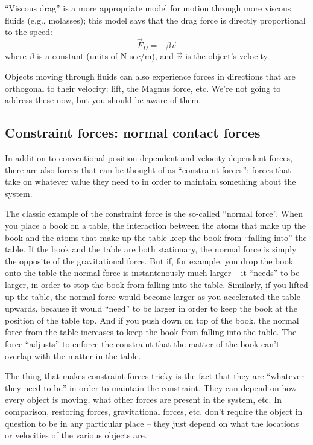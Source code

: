 \documentclass{tufte-handout}
\begin{document}
``Viscous drag'' is a more appropriate model for motion through more viscous fluids (e.g., molasses); this model says that the drag force is directly proportional to the speed:
$$\vec{F}_{D} = -\beta \vec{v}$$
where $\beta$ is a constant (units of N-sec/m), and $\vec{v}$ is the object's velocity.

Objects moving through fluids can also experience forces in directions that are orthogonal to their velocity: lift, the Magnus force, etc.  We're not going to address these now, but you should be aware of them.

\subsection{Constraint forces: normal contact forces}

In addition to conventional position-dependent and velocity-dependent forces, there are also forces that can be thought of as ``constraint forces'': forces that take on whatever value they need to in order to maintain something about the system.  

The classic example of the constraint force is the so-called ``normal force''.  When you place a book on a table, the interaction between the atoms that make up the book and the atoms that make up the table keep the book from ``falling into'' the table.  
If the book and the table are both stationary, the normal force is simply the opposite of the gravitational force.  But if, for example, you drop the book onto the table the normal force is instantenously much larger -- it ``needs'' to be larger, in order to stop the book from falling into the table.  Similarly, if you lifted up the table, the normal force would become larger as you accelerated the table upwards, because it would ``need'' to be larger in order to keep the book at the position of the table top.  And if you push down on top of the book, the normal force from the table increases to keep the book from falling into the table.  The force ``adjusts'' to enforce the constraint that the matter of the book can't overlap with the matter in the table.

The thing that makes constraint forces tricky is the fact that they are ``whatever they need to be'' in order to maintain the constraint.  They can depend on how every object is moving, what other forces are present in the system, etc.  In comparison, restoring forces, gravitational forces, etc. don't require the object in question to be in any particular place -- they just depend on what the locations or velocities of the various objects are.
\end{document}
